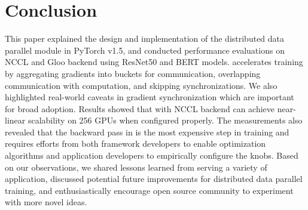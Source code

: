 
\section{Conclusion}\label{sec:conclusion}

This paper explained the design and implementation of the distributed data parallel module in PyTorch v1.5, and conducted performance evaluations on NCCL and Gloo backend using ResNet50 and BERT models.  accelerates training by aggregating gradients into buckets for communication, overlapping communication with computation, and skipping synchronizations. We also highlighted real-world caveats in gradient synchronization which are important for broad adoption.  Results showed that  with NCCL backend can achieve near-linear scalability on 256 GPUs when configured properly. The measurements also revealed that the backward pass in  is the most expensive step in training and requires efforts from both framework developers to enable optimization algorithms and application developers to empirically configure the knobs. Based on our observations, we shared lessons learned from serving a variety of application, discussed potential future improvements for distributed data parallel training, and enthusiastically encourage open source community to experiment with more novel ideas.

\newpage